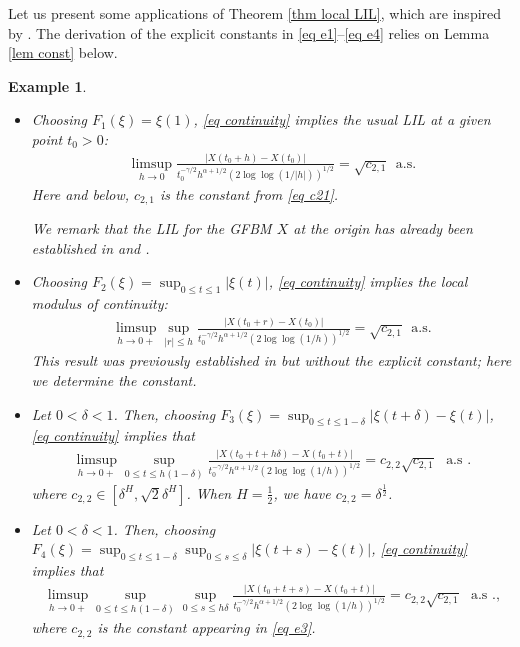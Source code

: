 \documentclass[11pt, reqno]{amsart}
\numberwithin{equation}{section}
\newtheorem{example}{Example}[section]
\newcommand{\1}{{\bf 1}}
\newcommand{\2}{{\bf 2}}
\begin{document}
 Let us present some applications of Theorem \ref{thm local LIL},  which are inspired by   \cite{AM05, Gantert}. 
  {The derivation of the explicit constants in \eqref{eq e1}–\eqref{eq e4} relies on Lemma \ref{lem const}  below. }
 \begin{example}\label{exa LIL}
 \begin{itemize}
\item[(a)] \label{example usual LIL}
    Choosing  $F_1(\xi)=\xi(1)$,   \eqref{eq continuity} implies the usual LIL at a given point $t_0 > 0$:  
   \begin{align}\label{eq e1}
   \limsup_{h\rightarrow0  }  \frac{|X(t_0+h)-X(t_0)|}{ t_0^{-\gamma/2} h^{\alpha+1/2}   \left(  {2\log\log}(1/ |h|)\right)^{1/2}}
   = {\sqrt{ c_{2,1} } }\ \ \text{a.s.}
       \end{align}
       Here and below, $c_{2,1}$ is the constant from \eqref{eq c21}.
       
We remark that  the   LIL for the GFBM $X$ at the origin has already been established in \cite[Theorem 6.1]{IPT2021}
  and \cite[Proposition 7.1]{WX2021a}.

 \item[(b)]
    Choosing  $F_2(\xi)=\sup_{0\le t\le 1}|\xi(t)|$,    \eqref{eq continuity} implies the  local modulus of continuity: 
   \begin{align} \label{eq e2}
   \limsup_{h\rightarrow0+  }\sup_{|r|\le h} \frac{|X(t_0+r)-X(t_0)|}{ t_0^{-\gamma/2} h^{\alpha+1/2}     \left(  {2\log\log}(1/ h)\right)^{1/2}}
   = {\sqrt{c_{2,1}  }} \ \ \text{a.s.} 
     \end{align}
      {This result was previously  established in   \cite[Theorem 1.5(a)]{WX2021a} but without  the explicit constant; here we determine the constant.  } 

\item[(c)]  Let  $0<\delta<1$. Then,   choosing  $F_3(\xi)=\sup_{0\le t\le 1-\delta}|\xi(t+\delta)-\xi(t)|$,     \eqref{eq continuity} implies that 
        \begin{align}\label{eq e3}
     \limsup_{h\rightarrow0+}\sup_{0\le t\le h(1-\delta)}\frac{|X(t_0+t+h\delta )-X(t_0+t)|}{ t_0^{-\gamma/2}h^{\alpha+1/2}   \left( {2\log\log}(1/ h)\right)^{1/2}}
       {= c_{2,2}\sqrt{c_{2,1}}  } \ \ \ \text{a.s {.}}
        \end{align}
        {where $c_{2,2} \in \left[\delta^H,  \sqrt{2} \delta^H\right]$}. 
        {When $H=\frac12$,  we have $c_{2,2}=\delta^{\frac12}$.}
          \item[(d)]  Let  $0<\delta<1$. Then,  choosing  $F_4(\xi)=\sup_{0\le t\le 1-\delta}\sup_{0\le s\le \delta}|\xi(t+s)-\xi(t)|$,  \eqref{eq continuity} implies  that
        \begin{align}\label{eq e4}
        \limsup_{h\rightarrow0+}\sup_{0\le t\le h(1-\delta)}\sup_{0\le s\le h\delta}\frac{|X(t_0+t+s )-X(t_0+t)|}{t_0^{-\gamma/2} h^{\alpha+1/2}  
        \left(  {2\log\log}(1/ h)\right)^{1/2}}   {=c_{2,2}\sqrt{c_{2,1}}  } \ \ \ \text{a.s {.},}
        \end{align}
 {where $c_{2,2}$ is  the constant appearing in \eqref{eq e3}.} 
   \end{itemize}   
                  

\end{example}
\end{document}
